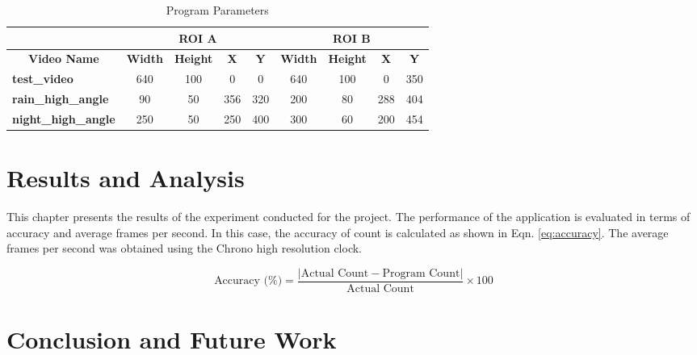 \documentclass[12pt,a4paper,fleqn]{report}
\begin{document}
\begin{table}[htbp]
    \centering
\begin{tabular}{l|cccc|cccc|}
\cline{2-9}
\textbf{} & \multicolumn{4}{c|}{\textbf{ROI A}} & \multicolumn{4}{c|}{\textbf{ROI B}} \\ \hline
\multicolumn{1}{|c|}{\textbf{Video Name}} & \multicolumn{1}{c|}{\textbf{Width}} & \multicolumn{1}{c|}{\textbf{Height}} & \multicolumn{1}{c|}{\textbf{X}} & \textbf{Y} & \multicolumn{1}{c|}{\textbf{Width}} & \multicolumn{1}{c|}{\textbf{Height}} & \multicolumn{1}{c|}{\textbf{X}} & \textbf{Y} \\ \hline
\multicolumn{1}{|l|}{\textbf{test\_video}} & \multicolumn{1}{c|}{640} & \multicolumn{1}{c|}{100} & \multicolumn{1}{c|}{0} & 0 & \multicolumn{1}{c|}{640} & \multicolumn{1}{c|}{100} & \multicolumn{1}{c|}{0} & 350 \\ \hline
\multicolumn{1}{|l|}{\textbf{rain\_high\_angle}} & \multicolumn{1}{c|}{90} & \multicolumn{1}{c|}{50} & \multicolumn{1}{c|}{356} & 320 & \multicolumn{1}{c|}{200} & \multicolumn{1}{c|}{80} & \multicolumn{1}{c|}{288} & 404 \\ \hline
\multicolumn{1}{|l|}{\textbf{night\_high\_angle}} & \multicolumn{1}{c|}{250} & \multicolumn{1}{c|}{50} & \multicolumn{1}{c|}{250} & 400 & \multicolumn{1}{c|}{300} & \multicolumn{1}{c|}{60} & \multicolumn{1}{c|}{200} & 454 \\ \hline
\end{tabular}
\caption{Program Parameters}
\label{tab:exprunparam}
\end{table}

\chapter{Results and Analysis}
This chapter presents the results of the experiment conducted for the project. 
The performance of the application is evaluated in terms of accuracy and average frames per second.
In this case, the accuracy of count is calculated as shown in Eqn. \ref{eq:accuracy}.
The average frames per second was obtained using the Chrono high resolution clock.

\begin{equation}
    \text{Accuracy (\%)} = \frac{\lvert\text{Actual Count} - \text{Program Count}\rvert}{\text{Actual Count}}
    \times 100
    \label{eq:accuracy}
\end{equation}


\chapter{Conclusion and Future Work}



{}
\end{document}
